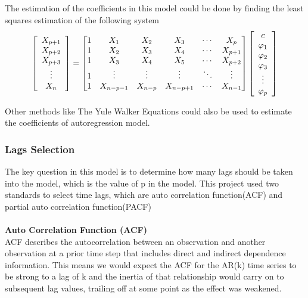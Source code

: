\documentclass{article}
\begin{document}
The estimation of the coefficients in this model could be done by finding the least squares estimation of the following system
\begin{equation}
\left[
\begin{array}[]{c}
	X_{p+1} \\
	X_{p+2} \\
	X_{p+3} \\
	\vdots  \\
	X_{n} 
\end{array}
\right]
=
\left[
\begin{matrix}
	1  &X_{1}  &X_{2}  &X_{3} &\cdots &X_{p} \\
	1  &X_{2}  &X_{3}  &X_{4} &\cdots &X_{p+1} \\
	1  &X_{3}  &X_{4}  &X_{5} &\cdots &X_{p+2} \\
	1  &\vdots &\vdots &\vdots&\ddots &\vdots \\
	1  &X_{n-p-1} &X_{n-p} &X_{n-p+1} &\cdots &X_{n-1} 
\end{matrix}
\right]
\left[
\begin{array}[]{c}
	c \\
	\varphi_{1} \\
	\varphi_{2} \\
	\varphi_{3} \\
	\vdots \\
	\varphi_{p}
\end{array}
\right]
\end{equation}

\begin{info} %
	Other methods like The Yule Walker Equations could also be used to estimate the coefficients of autoregression model.
\end{info}

\subsubsection{Lags Selection} 
The key question in this model is to determine how many lags should be taken into the model, which is the value of p in the model. This project used two standards to select time lags, which are auto correlation function(ACF) and partial auto correlation function(PACF)\\
\\
\textbf{Auto Correlation Function (ACF)}\\
ACF describes the autocorrelation between an observation and another observation at a prior time step that includes direct and indirect dependence information.
This means we would expect the ACF for the AR(k) time series to be strong to a lag of k and the inertia of that relationship would carry on to subsequent lag values, trailing off at some point as the effect was weakened.
\end{document}
